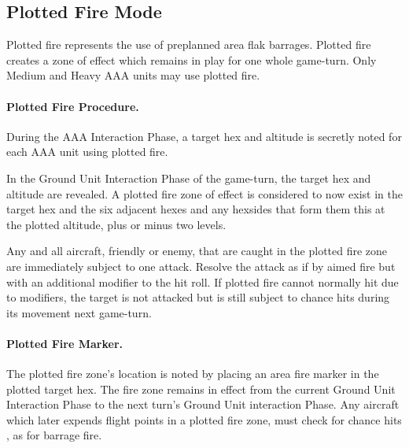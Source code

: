 \subsection{Plotted Fire Mode}

Plotted fire represents the use of preplanned area flak barrages. Plotted fire creates a zone of effect which remains in play for one whole game-turn. Only Medium and Heavy AAA units may use plotted fire.

\paragraph{Plotted Fire Procedure.} During the AAA Interaction Phase, a target hex and altitude is secretly noted for each AAA unit using plotted fire.

In the Ground Unit Interaction Phase of the game-turn, the target hex and altitude are revealed. A plotted fire zone of effect is considered to now exist in the target hex and the six adjacent hexes and any hexsides that form them this at the plotted altitude, plus or minus two levels. 

Any and all aircraft, friendly or enemy, that are caught in the plotted fire zone are immediately subject to one attack. Resolve the attack as if by aimed fire but with an additional  modifier to the hit roll. If plotted fire cannot normally hit due to modifiers, the target is not attacked but is still subject to chance hits during its movement next game-turn.

\paragraph{Plotted Fire Marker.} The plotted fire zone's location is noted by placing an area fire marker in the plotted target hex. The fire zone remains in effect from the current Ground Unit Interaction Phase to the next turn's Ground Unit interaction Phase. Any aircraft which later expends flight points in a plotted fire zone, must check for chance hits  , as for barrage fire. 

